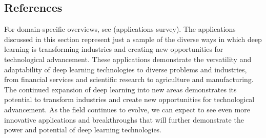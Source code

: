 \subsection{References}

For domain-specific overviews, see \textcite{Prince2023} (applications survey). The applications discussed in this section represent just a sample of the diverse ways in which deep learning is transforming industries and creating new opportunities for technological advancement. These applications demonstrate the versatility and adaptability of deep learning technologies to diverse problems and industries, from financial services and scientific research to agriculture and manufacturing. The continued expansion of deep learning into new areas demonstrates its potential to transform industries and create new opportunities for technological advancement. As the field continues to evolve, we can expect to see even more innovative applications and breakthroughs that will further demonstrate the power and potential of deep learning technologies.

